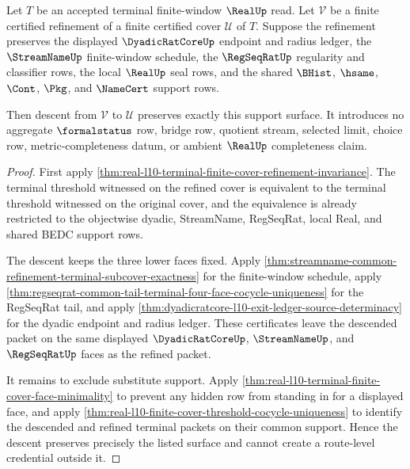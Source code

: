 \begin{theorem}
\label{thm:real-l10-refinement-support-descent-noescape}
Let $T$ be an accepted terminal finite-window $\RealUp$ read. Let
$\mathcal V$ be a finite certified refinement of a finite certified cover
$\mathcal U$ of $T$. Suppose the refinement preserves the displayed
$\DyadicRatCoreUp$ endpoint and radius ledger, the $\StreamNameUp$
finite-window schedule, the $\RegSeqRatUp$ regularity and classifier rows,
the local $\RealUp$ seal rows, and the shared $\BHist$, $\hsame$, $\Cont$,
$\Pkg$, and $\NameCert$ support rows.

Then descent from $\mathcal V$ to $\mathcal U$ preserves exactly this support
surface. It introduces no aggregate $\formalstatus$ row, bridge row, quotient
stream, selected limit, choice row, metric-completeness datum, or ambient
$\RealUp$ completeness claim.
\end{theorem}
\begin{proof}
First apply
\autoref{thm:real-l10-terminal-finite-cover-refinement-invariance}. The
terminal threshold witnessed on the refined cover is equivalent to the
terminal threshold witnessed on the original cover, and the equivalence is
already restricted to the objectwise dyadic, StreamName, RegSeqRat, local
Real, and shared BEDC support rows.

The descent keeps the three lower faces fixed. Apply
\autoref{thm:streamname-common-refinement-terminal-subcover-exactness} for the
finite-window schedule, apply
\autoref{thm:regseqrat-common-tail-terminal-four-face-cocycle-uniqueness} for
the RegSeqRat tail, and apply
\autoref{thm:dyadicratcore-l10-exit-ledger-source-determinacy} for the dyadic
endpoint and radius ledger. These certificates leave the descended packet on
the same displayed $\DyadicRatCoreUp$, $\StreamNameUp$, and $\RegSeqRatUp$
faces as the refined packet.

It remains to exclude substitute support. Apply
\autoref{thm:real-l10-terminal-finite-cover-face-minimality} to prevent any
hidden row from standing in for a displayed face, and apply
\autoref{thm:real-l10-finite-cover-threshold-cocycle-uniqueness} to identify
the descended and refined terminal packets on their common support. Hence the
descent preserves precisely the listed surface and cannot create a
route-level credential outside it.
\end{proof}
